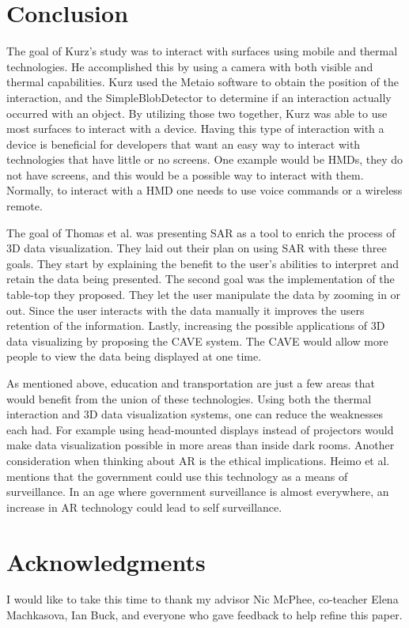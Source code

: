 \documentclass{sig-alternate}
\begin{document}
\section{Conclusion}
\label{Conclusion}
The goal of  Kurz's \cite{Thermal} study was to interact with surfaces using mobile and thermal technologies. He accomplished this by using a camera with both visible and thermal capabilities. Kurz \cite{Thermal} used the Metaio software to obtain the position of the interaction, and the SimpleBlobDetector to determine if an interaction actually occurred with an object. By utilizing those two together, Kurz was able to use most surfaces to interact with a device. Having this type of interaction with a device is beneficial for developers that want an easy way to interact with technologies that have little or no screens. One example would be HMDs, they do not have screens, and this would be a possible way to interact with them. Normally, to interact with a HMD one needs to use voice commands or a wireless remote. 

The goal of Thomas et al. \cite{3D} was presenting SAR as a tool to enrich the process of 3D data visualization. They laid out their plan on using SAR with these three goals. They start by explaining the benefit to the user's abilities to interpret and retain the data being presented. The second goal was the implementation of the table-top they proposed. They let the user manipulate the data by zooming in or out. Since the user interacts with the data manually it improves the users retention of the information. Lastly, increasing the possible applications of 3D data visualizing by proposing the CAVE system. The CAVE would allow more people to view the data being displayed at one time.

As mentioned above, education and transportation are just a few areas that would benefit from the union of these technologies. Using both the thermal interaction and 3D data visualization systems, one can reduce the weaknesses each had. For example using head-mounted displays instead of projectors would make data visualization possible in more areas than inside dark rooms. Another consideration when thinking about AR is the ethical implications. Heimo et al. \cite{ethics} mentions that the government could use this technology as a means of surveillance. In an age where government surveillance is almost everywhere, an increase in AR technology could lead to self surveillance.


\section*{Acknowledgments}
\label{sec:Acknowledgments}
I would like to take this time to thank my advisor Nic McPhee, co-teacher Elena Machkasova, Ian Buck, and everyone who gave feedback to help refine this paper. 


\end{document}
